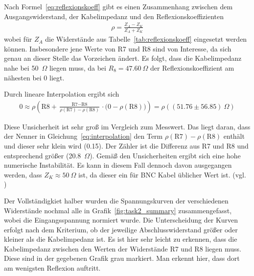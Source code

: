 \documentclass{article}
\begin{document}
Nach Formel~\eqref{eq:reflexionskoeff} gibt es einen Zusammenhang zwischen dem Ausgangswiderstand, der Kabelimpedanz und den Reflexionskoeffizienten
\begin{align*}
\rho = \frac{Z_A-Z_K}{Z_A+Z_K}
\end{align*}
wobei für $Z_A$ die Widerstände aus Tabelle~\ref{tab:reflexionskoeff} eingesetzt werden können. Insbesondere jene Werte von R7 und R8 sind von Interesse, da sich genau an dieser Stelle das Vorzeichen ändert. Es folgt, dass die Kabelimpedanz nahe bei 50~$\Omega$ liegen muss, da bei $R_8 = 47.60~\Omega$ der Reflexionskoeffizient am nähesten bei $0$ liegt.

Durch lineare Interpolation ergibt sich
\begin{align}
\label{eq:interpolation}
0 \approx \rho\left(\text{R8} + \frac{\text{R7}-\text{R8}}{\rho(\text{R7}) - \rho(\text{R8})} \cdot \big(0 -\rho(\text{R8}) \big)  \right) = \rho\left(\left(51.76 \pm 56.85\right)~\Omega\right)
\end{align}

Diese Unsicherheit ist sehr groß im Vergleich zum Messwert. Das liegt daran, dass der Nenner in Gleichung~\eqref{eq:interpolation} den Term $\rho(\text{R7}) - \rho(\text{R8})$ enthält und dieser sehr klein wird (0.15). Der Zähler ist die Differenz aus R7 und R8 und entsprechend größer (20.8~$\Omega$). Gemäß den Unsicherheiten ergibt sich eine hohe numerische Instabilität. Es kann in diesem Fall dennoch davon ausgegangen werden, dass $Z_K \approx 50~\Omega$ ist, da dieser ein für BNC Kabel üblicher Wert ist. (vgl. \cite{bnc})


Der Vollständigkiet halber wurden die Spannungskurven der verschiedenen Widerstände nochmal alle in Grafik~\ref{fig:task2_summary} zusammengefasst, wobei die Eingangsspannung normiert wurde. Die Unterscheidung der Kurven erfolgt nach dem Kriterium, ob der jeweilige Abschlusswiderstand größer oder kleiner als die Kabelimpedanz ist. Es ist hier sehr leicht zu erkennen, dass die Kabelimpedanz zwischen den Werten der Widerstände R7 und R8 liegen muss. Diese sind in der gegebenen Grafik grau markiert. Man erkennt hier, dass dort am wenigsten Reflexion auftritt.
\end{document}
